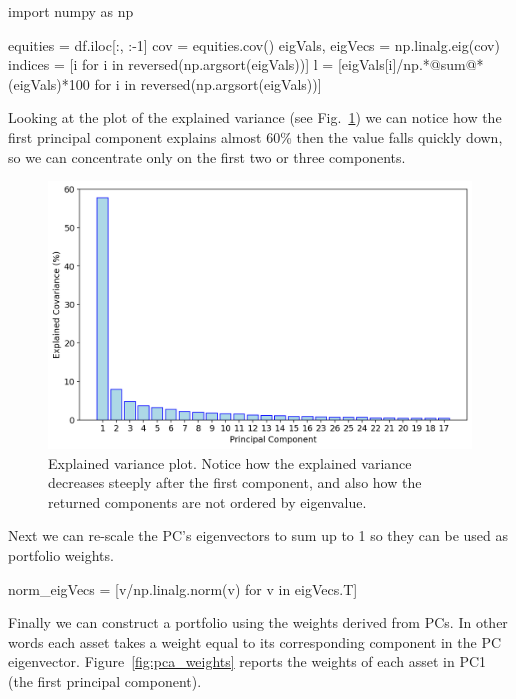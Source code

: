 \begin{ipython}
import numpy as np

equities = df.iloc[:, :-1]
cov = equities.cov()
eigVals, eigVecs = np.linalg.eig(cov)
indices = [i for i in reversed(np.argsort(eigVals))]
l = [eigVals[i]/np.*@sum@*(eigVals)*100 for i in reversed(np.argsort(eigVals))]
\end{ipython}
	
Looking at the plot of the explained variance (see
Fig.~\ref{fig:explained_variance}) we can notice how the first principal
component explains almost 60\% then the value falls quickly down, so we can concentrate only on the first two or three components.

\begin{figure}[htb]
	\centering
	\includegraphics[width=.7\textwidth]{figures/portfolio_pca_expl_var}
	\caption{Explained variance plot. Notice how the explained variance decreases steeply after the first component, and also how the returned components are not ordered by eigenvalue.}
	\label{fig:explained_variance}
\end{figure}
		
Next we can re-scale the PC's eigenvectors to sum up to 1 so they can be
used as portfolio weights.
	
\begin{ipython}
norm_eigVecs = [v/np.linalg.norm(v) for v in eigVecs.T]
\end{ipython}
	
Finally we can construct a portfolio using the weights derived from PCs.
In other words each asset takes a weight equal to its corresponding
component in the PC eigenvector. Figure~\ref{fig:pca_weights} reports
the weights of each asset in PC1 (the first principal component).
	
